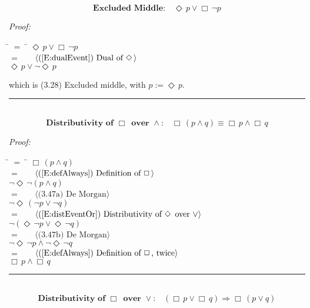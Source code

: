 \documentclass[fleqn, leqno]{article}
\newcommand{\lgap}{2pt} %
\newcommand{\mymathindent}{24pt} %
\newcommand{\Event}{\Diamond\,}
\newcommand{\Always}{\Box\,}
\newcommand{\myqed}{\hfill\rule[-.23ex]{1.2ex}{2.0ex}}
\newcommand{\Gll} {\langle} %
\newcommand{\Ggg} {\rangle} %
\newcommand{\Hint}[1] {\ \ \ $\Gll \mbox{#1} \Ggg$ } %
\begin{document}
\begin{equation}\label{E:excludedMid}
\textbf{Excluded Middle:}\quad \Event p \lor \Always\lnot p
\end{equation}

\emph{Proof:}
\begin{tabbing}
\hspace{\mymathindent} \= $= \;$ \= \kill
\> \> $\Event p \lor \Always\lnot p$\\[\lgap]
\> $=$ \> \Hint{(\ref{E:dualEvent}) Dual of $\Event$}\\[\lgap]
\> \> $\Event p \lor \lnot\Event p$\\[\lgap]
\end{tabbing}
which is (3.28) Excluded middle, with $p := \Event p$. \myqed\\[\lgap]


\begin{equation}\label{E:distAlwaysAnd}
\textbf{Distributivity of $\Always$ over $\land$:}\quad \Always (p \land q) \equiv \Always p \land \Always q
\end{equation}

\emph{Proof:}
\begin{tabbing}
\hspace{\mymathindent} \= $= \;$ \= \kill
\> \> $\Always (p \land q)$\\[\lgap]
\> $=$ \> \Hint{(\ref{E:defAlways}) Definition of $\Always$}\\[\lgap]
\> \> $\lnot\Event\lnot (p \land q)$\\[\lgap]
\> $=$ \> \Hint{(3.47a) De Morgan}\\[\lgap]
\> \> $\lnot\Event (\lnot p \lor \lnot q)$\\[\lgap]
\> $=$ \> \Hint{(\ref{E:distEventOr}) Distributivity of $\Event$ over $\lor$}\\[\lgap]
\> \> $\lnot (\Event\lnot p \lor \Event\lnot q)$\\[\lgap]
\> $=$ \> \Hint{(3.47b) De Morgan}\\[\lgap]
\> \> $\lnot\Event\lnot p \land \lnot\Event\lnot q$\\[\lgap]
\> $=$ \> \Hint{(\ref{E:defAlways}) Definition of $\Always$, twice}\\[\lgap]
\> \> $\Always p \land \Always q$
\end{tabbing}
\myqed\\[\lgap]


\begin{equation}\label{E:distAlwaysOr}
\textbf{Distributivity of $\Always$ over $\lor$:}\quad (\Always p \lor \Always q) \Rightarrow \Always (p \lor q)
\end{equation}
\end{document}

